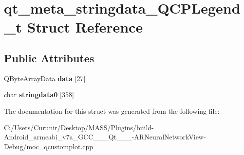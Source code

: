 \hypertarget{structqt__meta__stringdata___q_c_p_legend__t}{}\section{qt\+\_\+meta\+\_\+stringdata\+\_\+\+Q\+C\+P\+Legend\+\_\+t Struct Reference}
\label{structqt__meta__stringdata___q_c_p_legend__t}
\subsection*{Public Attributes}
\begin{DoxyCompactItemize}
\item 
\mbox{\label{structqt__meta__stringdata___q_c_p_legend__t_a14ab33d3492409eb00a6a6cea5031e0f}} 
Q\+Byte\+Array\+Data {\bfseries data} \mbox{[}27\mbox{]}
\item 
\mbox{\label{structqt__meta__stringdata___q_c_p_legend__t_a95066bda8ae4d16d858a9b6d6ccebfc9}} 
char {\bfseries stringdata0} \mbox{[}358\mbox{]}
\end{DoxyCompactItemize}


The documentation for this struct was generated from the following file\+:\begin{DoxyCompactItemize}
\item 
C\+:/\+Users/\+Curunir/\+Desktop/\+M\+A\+S\+S/\+Plugins/build-\/\+Android\+\_\+armeabi\+\_\+v7a\+\_\+\+G\+C\+C\+\_\+\_\+\_\+\+Qt\+\_\+\_\+\_-\/\+A\+R\+Neural\+Network\+View-\/\+Debug/moc\+\_\+qcustomplot.\+cpp\end{DoxyCompactItemize}
